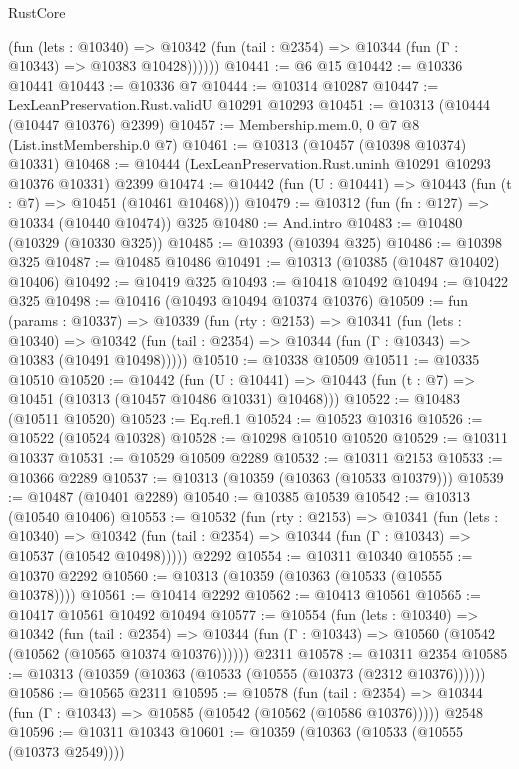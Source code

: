 \begin{lexlean}{RustCore}
\begin{coremodule}
          (fun (lets : @10340) =>
          @10342 (fun (tail : @2354) => @10344 (fun (Γ : @10343) => @10383 @10428))))))
@10441 := @6 @15
@10442 := @10336 @10441
@10443 := @10336 @7
@10444 := @10314 @10287
@10447 := LexLeanPreservation.Rust.validU @10291 @10293
@10451 := @10313 (@10444 (@10447 @10376) @2399)
@10457 := Membership.mem.{0, 0} @7 @8 (List.instMembership.{0} @7)
@10461 := @10313 (@10457 (@10398 @10374) @10331)
@10468 := @10444 (LexLeanPreservation.Rust.uninh @10291 @10293 @10376 @10331) @2399
@10474 := @10442 (fun (U : @10441) => @10443 (fun (t : @7) => @10451 (@10461 @10468)))
@10479 := @10312 (fun (fn : @127) => @10334 (@10440 @10474)) @325
@10480 := And.intro
@10483 := @10480 (@10329 (@10330 @325))
@10485 := @10393 (@10394 @325)
@10486 := @10398 @325
@10487 := @10485 @10486
@10491 := @10313 (@10385 (@10487 @10402) @10406)
@10492 := @10419 @325
@10493 := @10418 @10492
@10494 := @10422 @325
@10498 := @10416 (@10493 @10494 @10374 @10376)
@10509 := fun (params : @10337) =>
  @10339
    (fun (rty : @2153) =>
    @10341
      (fun (lets : @10340) =>
      @10342 (fun (tail : @2354) => @10344 (fun (Γ : @10343) => @10383 (@10491 @10498)))))
@10510 := @10338 @10509
@10511 := @10335 @10510
@10520 := @10442
    (fun (U : @10441) => @10443 (fun (t : @7) => @10451 (@10313 (@10457 @10486 @10331) @10468)))
@10522 := @10483 (@10511 @10520)
@10523 := Eq.refl.{1}
@10524 := @10523 @10316
@10526 := @10522 (@10524 @10328)
@10528 := @10298 @10510 @10520
@10529 := @10311 @10337
@10531 := @10529 @10509 @2289
@10532 := @10311 @2153
@10533 := @10366 @2289
@10537 := @10313 (@10359 (@10363 (@10533 @10379)))
@10539 := @10487 (@10401 @2289)
@10540 := @10385 @10539
@10542 := @10313 (@10540 @10406)
@10553 := @10532
    (fun (rty : @2153) =>
    @10341
      (fun (lets : @10340) =>
      @10342 (fun (tail : @2354) => @10344 (fun (Γ : @10343) => @10537 (@10542 @10498)))))
    @2292
@10554 := @10311 @10340
@10555 := @10370 @2292
@10560 := @10313 (@10359 (@10363 (@10533 (@10555 @10378))))
@10561 := @10414 @2292
@10562 := @10413 @10561
@10565 := @10417 @10561 @10492 @10494
@10577 := @10554
    (fun (lets : @10340) =>
    @10342
      (fun (tail : @2354) =>
      @10344 (fun (Γ : @10343) => @10560 (@10542 (@10562 (@10565 @10374 @10376))))))
    @2311
@10578 := @10311 @2354
@10585 := @10313 (@10359 (@10363 (@10533 (@10555 (@10373 (@2312 @10376))))))
@10586 := @10565 @2311
@10595 := @10578
    (fun (tail : @2354) => @10344 (fun (Γ : @10343) => @10585 (@10542 (@10562 (@10586 @10376)))))
    @2548
@10596 := @10311 @10343
@10601 := @10359 (@10363 (@10533 (@10555 (@10373 @2549))))

\end{coremodule}
\end{lexlean}
